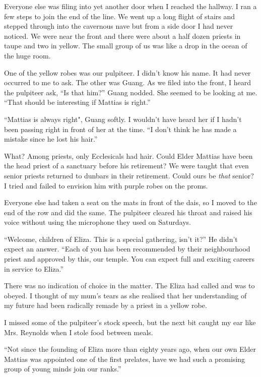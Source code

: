 Everyone else was filing into yet another door when I reached the hallway. I ran a few steps to join the end of the line. We went up a long flight of stairs and stepped through into the cavernous nave but from a side door I had never noticed. We were near the front and there were about a half dozen priests in taupe and two in yellow. The small group of us was like a drop in the ocean of the huge room.

One of the yellow robes was our pulpiteer. I didn't know his name. It had never occurred to me to ask. The other was Guang. As we filed into the front, I heard the pulpiteer ask, ``Is that him?'' Guang nodded. She seemed to be looking at me. ``That should be interesting if Mattias is right.''

``Mattias is always right", Guang softly. I wouldn't have heard her if I hadn't been passing right in front of her at the time. ``I don't think he has made a mistake since he lost his hair.''

What? Among priests, only Ecclesicals had hair. Could Elder Mattias have been the head priest of a sanctuary before his retirement? We were taught that even senior priests returned to dunbars in their retirement. Could ours be \textit{that} senior? I tried and failed to envision him with purple robes on the proms.

Everyone else had taken a seat on the mats in front of the dais, so I moved to the end of the row and did the same. The pulpiteer cleared his throat and raised his voice without using the microphone they used on Saturdays.

``Welcome, children of Eliza. This is a special gathering, isn't it?'' He didn't expect an answer. ``Each of you has been recommended by their neighbourhood priest and approved by this, our temple. You can expect full and exciting careers in service to Eliza.''

There was no indication of choice in the matter. The Eliza had called and was to obeyed. I thought of my mum's tears as she realised that her understanding of my future had been radically remade by a priest in a yellow robe.

I missed some of the pulpiteer's stock speech, but the next bit caught my ear like Mrs. Reynolds when I stole food between meals.

``Not since the founding of Eliza more than eighty years ago, when our own Elder Mattias was appointed one of the first prelates, have we had such a promising group of young minds join our ranks.''

